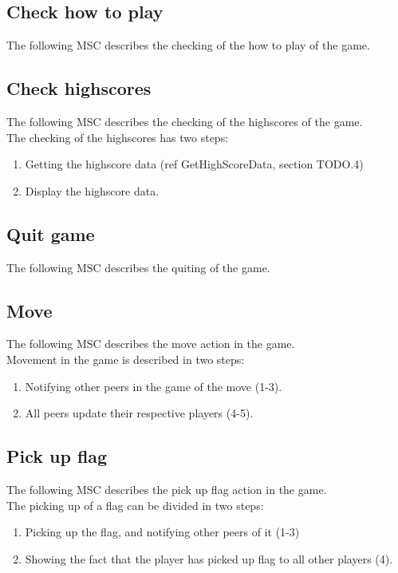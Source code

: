\documentclass[a4paper,twoside,11pt]{article}
\begin{document}
\subsection{Check how to play}
The following MSC describes the checking of the how to play of the game.\\

\subsection{Check highscores}
The following MSC describes the checking of the highscores of the game.\\
The checking of the highscores has two steps:
\begin{enumerate}
\item Getting the highscore data (ref GetHighScoreData, section TODO.4)
\item Display the highscore data.
\end{enumerate}

\subsection{Quit game}
The following MSC describes the quiting of the game.\\

\subsection{Move}
The following MSC describes the move action in the game.\\
Movement in the game is described in two steps:
\begin{enumerate}
\item Notifying other peers in the game of the move (1-3).
\item All peers update their respective players (4-5).
\end{enumerate}

\subsection{Pick up flag}
The following MSC describes the pick up flag action in the game.\\
The picking up of a flag can be divided in two steps:
\begin{enumerate}
\item Picking up the flag, and notifying other peers of it (1-3)
\item Showing the fact that the player has picked up flag to all other players (4).
\end{enumerate}
\end{document}
